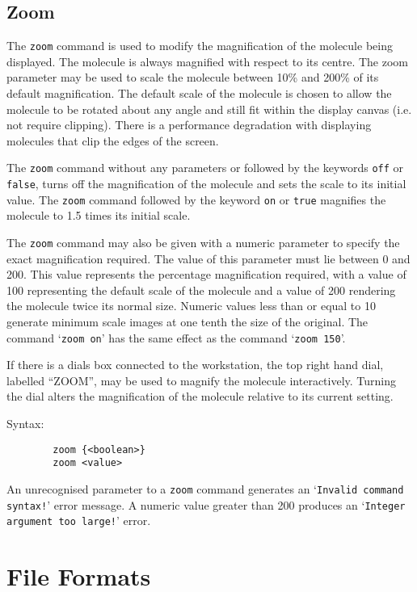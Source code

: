 \subsection{Zoom}
\label{CZoom}

The {\tt zoom} command is used to modify the magnification of the molecule
being displayed. The molecule is always magnified with respect to its centre.
The zoom parameter may be used to scale the molecule between
10\% and 200\% of its default magnification. The default scale of
the molecule is chosen to allow the molecule to be rotated about any angle
and still fit within the display canvas (i.e. not require clipping). There
is a performance degradation with displaying molecules that clip the edges
of the screen.

The {\tt zoom} command without any parameters or followed by the keywords
{\tt off} or {\tt false}, turns off the magnification of the molecule and
sets the scale to its initial value. The {\tt zoom} command followed by
the keyword {\tt on} or {\tt true} magnifies the molecule to 1.5 times its
initial scale.

The {\tt zoom} command may also be given with a numeric parameter to specify
the exact magnification required. The value of this parameter must lie 
between 0 and 200. This value represents the percentage magnification 
required, with a value of 100 representing the default scale of the molecule 
and a value of 200 rendering the molecule twice its normal size. Numeric 
values less than or equal to 10 generate minimum scale images at one tenth 
the size of the original. The command `{\tt zoom on}' has the same effect 
as the command `{\tt zoom 150}'.

If there is a dials box connected to the workstation, the top right hand
dial, labelled ``ZOOM'', may be used to magnify the molecule interactively.
Turning the dial alters the magnification of the molecule relative to its
current setting.


Syntax: 
\begin{verbatim}
        zoom {<boolean>}
        zoom <value>
\end{verbatim}

An unrecognised parameter to a {\tt zoom} command generates an `{\tt Invalid
command syntax!}' error message. A numeric value greater than 200 produces
an `{\tt Integer argument too large!}' error.


\section{File Formats}
\label{Formats}

